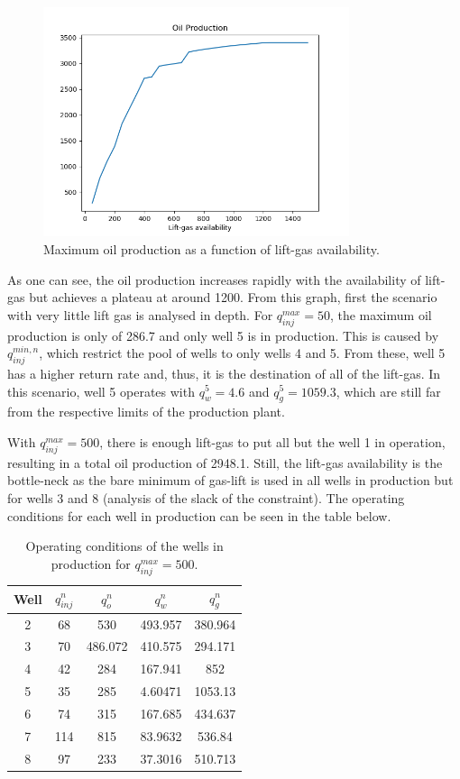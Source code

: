 \documentclass[a4paper]{report}
\begin{document}
\begin{figure}[H]
    \centering
    \includegraphics[width=0.8\textwidth]{oil_production.png}
    \caption{Maximum oil production as a function of lift-gas availability.}
    \label{fig:oil_production-png}
\end{figure}

As one can see, the oil production increases rapidly with the availability of lift-gas but achieves a plateau at around 1200. From this graph, first the scenario with very little lift gas is analysed in depth. For $q_{inj}^{max} = 50$, the maximum oil production is only of 286.7 and only well 5 is in production. This is caused by $q_{inj}^{min,n}$, which restrict the pool of wells to only wells 4 and 5. From these, well 5 has a higher return rate and, thus, it is the destination of all of the lift-gas. In this scenario, well 5 operates with $q_w^{5} = 4.6$ and $q_g^{5} = 1059.3$, which are still far from the respective limits of the production plant.

With $q_{inj}^{max} = 500$, there is enough lift-gas to put all but the well 1 in operation, resulting in a total oil production of 2948.1. Still, the lift-gas availability is the bottle-neck as the bare minimum of gas-lift is used in all wells in production but for wells 3 and 8 (analysis of the slack of the constraint). The operating conditions for each well in production can be seen in the table below.

\begin{table}[H]
    \centering
    \begin{tabular}{c|c|c|c|c}
	Well & $q_{inj}^{n}$ & $q_o^{n}$ & $q_w^{n}$ & $q_g^{n}$ \\
	\hline
	2 & 68 & 530 & 493.957 & 380.964 \\
	3 & 70 & 486.072 & 410.575 & 294.171 \\
	4 & 42 & 284 & 167.941 & 852 \\
	5 & 35 & 285 & 4.60471 & 1053.13 \\
	6 & 74 & 315 & 167.685 & 434.637 \\
	7 & 114 & 815 & 83.9632 & 536.84 \\
	8 & 97 & 233 & 37.3016 & 510.713
    \end{tabular}
    \caption*{Operating conditions of the wells in production for $q_{inj}^{max} = 500$.}
    \label{tab:label}
\end{table}
\end{document}
